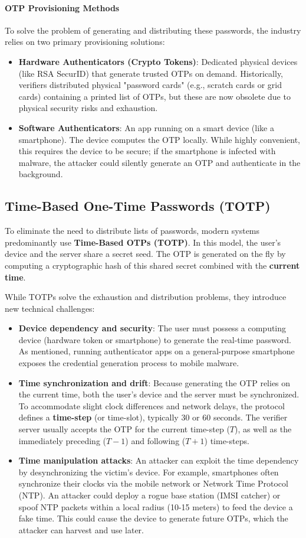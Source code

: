 \paragraph{OTP Provisioning Methods}
To solve the problem of generating and distributing these passwords, the industry relies on two primary provisioning solutions:
\begin{itemize}
    \item \textbf{Hardware Authenticators (Crypto Tokens)}: Dedicated physical devices (like RSA SecurID) that generate trusted OTPs on demand. Historically, verifiers distributed physical "password cards" (e.g., scratch cards or grid cards) containing a printed list of OTPs, but these are now obsolete due to physical security risks and exhaustion.
    \item \textbf{Software Authenticators}: An app running on a smart device (like a smartphone). The device computes the OTP locally. While highly convenient, this requires the device to be secure; if the smartphone is infected with malware, the attacker could silently generate an OTP and authenticate in the background.
\end{itemize}

\subsection{Time-Based One-Time Passwords (TOTP)}
To eliminate the need to distribute lists of passwords, modern systems predominantly use \textbf{Time-Based OTPs (TOTP)}. In this model, the user's device and the server share a secret seed. The OTP is generated on the fly by computing a cryptographic hash of this shared secret combined with the \textbf{current time}.

While TOTPs solve the exhaustion and distribution problems, they introduce new technical challenges:
\begin{itemize}
    \item \textbf{Device dependency and security}: The user must possess a computing device (hardware token or smartphone) to generate the real-time password. As mentioned, running authenticator apps on a general-purpose smartphone exposes the credential generation process to mobile malware.
    \item \textbf{Time synchronization and drift}: Because generating the OTP relies on the current time, both the user's device and the server must be synchronized. To accommodate slight clock differences and network delays, the protocol defines a \textbf{time-step} (or time-slot), typically 30 or 60 seconds. The verifier server usually accepts the OTP for the current time-step ($T$), as well as the immediately preceding ($T-1$) and following ($T+1$) time-steps.
    \item \textbf{Time manipulation attacks}: An attacker can exploit the time dependency by desynchronizing the victim's device. For example, smartphones often synchronize their clocks via the mobile network or Network Time Protocol (NTP). An attacker could deploy a rogue base station (IMSI catcher) or spoof NTP packets within a local radius (10-15 meters) to feed the device a fake time. This could cause the device to generate future OTPs, which the attacker can harvest and use later.
\end{itemize}
